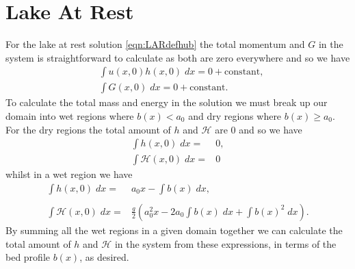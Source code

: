\section{Lake At Rest}
For the lake at rest solution \eqref{eqn:LARdefhub} the total momentum and $G$ in the system is straightforward to calculate as both are zero everywhere and so we have 
\begin{subequations}
	\label{eqn:AppLARu}
\begin{align}
&\int u(x,0)h(x,0) \;  dx = {} 0 + \text{constant}, \\
&\int G(x,0) \; dx = {} 0 + \text{constant}.
\end{align}
\end{subequations}
To calculate the total mass and energy in the solution we must break up our domain into wet regions where $b(x) < a_0$ and dry regions where $b(x) \ge a_0$. For the dry regions the total amount of $h$ and $\mathcal{H}$ are $0$ and so we have 
\begin{subequations}
	\label{eqn:AppLARhdry}
	\begin{align}
	\int h(x,0) \; dx = {} & 0 , \\
	\int \mathcal{H}(x,0) \; dx = {} & 0
	\end{align}
\end{subequations}
whilst in a wet region we have 
\begin{subequations}
	\label{eqn:AppLARhwet}
	\begin{align}
	\int h(x,0) \; dx = {} & a_0 x -  \int b(x) \; dx , \\  \nonumber \\
	\int \mathcal{H}(x,0) \; dx = {} & \frac{g}{2} \left(a_0^2x  -  2a_0 \int b(x) \; dx + \int b(x)^2 \; dx \right).
	\end{align}
\end{subequations}
By summing all the wet regions in a given domain together we can calculate the total amount of $h$ and $\mathcal{H}$ in the system from these expressions, in terms of the bed profile $b(x)$, as desired. 
